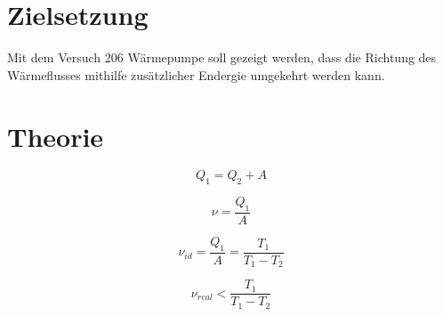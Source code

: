 \section{Zielsetzung}
\label{sec:Zielsetzung}

Mit dem Versuch 206 Wärmepumpe soll gezeigt werden, dass die Richtung des Wärmeflusses mithilfe zusätzlicher 
Endergie umgekehrt werden kann.


\section{Theorie}
\label{sec:Theorie}



\begin{equation}\label{eqn:hauptsatz1}
    Q_1 = Q_2 + A
\end{equation}

\begin{equation}\label{eqn:gueteziffer}
    ν = \frac{Q_1}{A}
\end{equation}

\begin{equation}\label{eqn:guetezfferIdeal}
    ν_{id} = \frac{Q_1}{A} = \frac{T_1}{T_1 - T_2}
\end{equation}

\begin{equation}\label{eqn:guetezifferReal}
    ν_{real} < \frac{T_1}{T_1 - T_2}
\end{equation}

\cite{sample}
